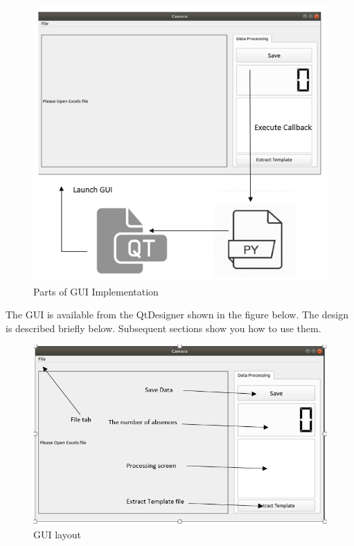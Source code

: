 \documentclass[journal, twocolumn]{IEEEtran}
\begin{document}
\begin{figure}[!h]
	\centering
	\includegraphics[width=0.8\linewidth]{img/gui.png}
	\caption{Parts of GUI Implementation}\label{fig:gui}
\end{figure}

The GUI is available from the QtDesigner shown in the figure below. The design is described briefly below. Subsequent sections show you how to use them.

\begin{figure}[!h]
	\centering
	\includegraphics[width=0.8\linewidth]{img/user_guide.png}
	\caption{GUI layout}\label{fig:user_guide}
\end{figure}
\end{document}
